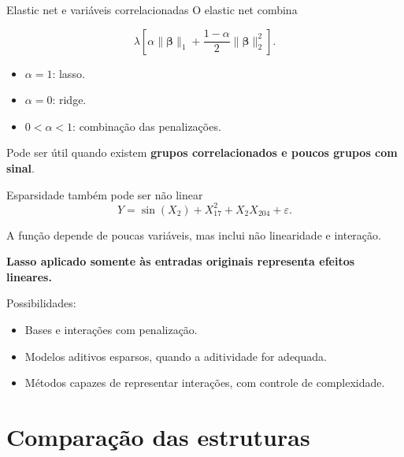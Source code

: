 \documentclass[
  10pt,
  ignorenonframetext,
  aspectratio=169,
  brazilian,
]{beamer}
\providecommand{\tightlist}{%
  \setlength{\itemsep}{0pt}\setlength{\parskip}{0pt}}
\begin{document}
\begin{frame}{Elastic net e variáveis correlacionadas}
\protect{}\label{elastic-net-e-variuxe1veis-correlacionadas}
O elastic net combina

\[
\lambda\left[
\alpha\|\boldsymbol\beta\|_1
+\frac{1-\alpha}{2}\|\boldsymbol\beta\|_2^2
\right].
\]

\begin{itemize}
\tightlist
\item
  \(\alpha=1\): lasso.
\item
  \(\alpha=0\): ridge.
\item
  \(0<\alpha<1\): combinação das penalizações.
\end{itemize}

Pode ser útil quando existem \textbf{grupos correlacionados e poucos
grupos com sinal}.

\end{frame}

\begin{frame}{Esparsidade também pode ser não linear}
\protect{}\label{esparsidade-tambuxe9m-pode-ser-nuxe3o-linear}
\[
Y=\sin(X_2)+X_{17}^2+X_2X_{204}+\varepsilon.
\]

A função depende de poucas variáveis, mas inclui não linearidade e
interação.

\textbf{Lasso aplicado somente às entradas originais representa efeitos
lineares.}

Possibilidades:

\begin{itemize}
\tightlist
\item
  Bases e interações com penalização.
\item
  Modelos aditivos esparsos, quando a aditividade for adequada.
\item
  Métodos capazes de representar interações, com controle de
  complexidade.
\end{itemize}
\end{frame}

\section{Comparação das
estruturas}\label{comparauxe7uxe3o-das-estruturas}
\end{document}
